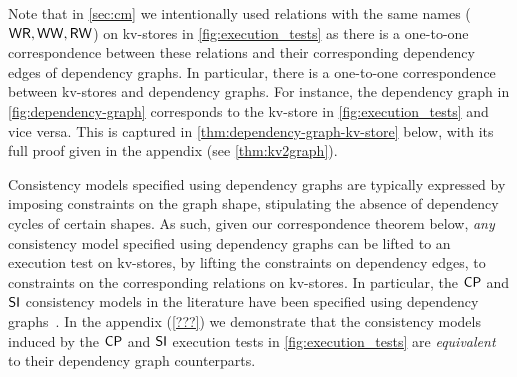 

Note that in \cref{sec:cm} we intentionally used relations with the same names ($\mathsf{WR}, \mathsf{WW}, \mathsf{RW}$) on kv-stores in \cref{fig:execution_tests} as there is a one-to-one correspondence between these relations and their corresponding dependency edges of dependency graphs. 
In particular, there is a one-to-one correspondence between kv-stores and dependency graphs. 
For instance, the dependency graph in \cref{fig:dependency-graph} corresponds to the kv-store in \cref{fig:execution_tests} and vice versa. 
This is captured in \cref{thm:dependency-graph-kv-store} below, with its full proof given in the  appendix (see \cref{thm:kv2graph}). 

Consistency models specified using dependency graphs are typically expressed by imposing constraints on the graph shape, \eg stipulating the absence of dependency cycles of certain shapes. 
As such, given our correspondence theorem below, \emph{any} consistency model specified using dependency graphs can be lifted to an execution test on kv-stores, by lifting the constraints on dependency edges, to constraints on the corresponding relations on kv-stores. 
In particular, the $\mathsf{CP}$ and $\mathsf{SI}$ consistency models in the literature have been specified using dependency graphs~\cite{??}. 
In the appendix (\cref{???}) we demonstrate that the consistency models induced by the $\mathsf{CP}$ and $\mathsf{SI}$ execution tests in \cref{fig:execution_tests} are \emph{equivalent} to their dependency graph counterparts. 

